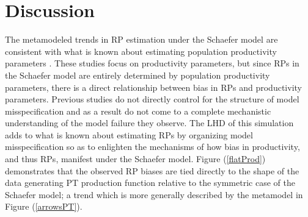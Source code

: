 
%
\clearpage
\section{Discussion}


%
The metamodeled trends in RP estimation under the Schaefer model are consistent 
with what is known about estimating population productivity parameters 
\cite{lee_can_2012, conn_when_2010, magnusson_what_2007}. These studies 
focus on productivity parameters, but since RPs in the Schaefer model are 
entirely determined by population productivity parameters, there is a 
direct relationship between bias in RPs and productivity parameters. 
Previous studies do not directly control for the structure of model 
misspecification and as a result do not come to a complete mechanistic 
understanding of the model failure they observe.
%
The LHD of this simulation adds to what is known about estimating RPs by 
organizing model misspecification so as to enlighten the mechanisms of how 
bias in productivity, and thus RPs, manifest under the Schaefer model. 
Figure (\ref{flatProd}) demonstrates that the observed RP biases are tied directly to 
the shape of the data generating PT production function relative to the symmetric case 
of the Schaefer model; a trend which is more generally described by the metamodel in 
Figure (\ref{arrowsPT}).

